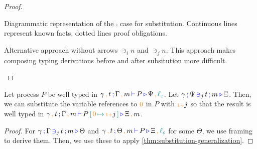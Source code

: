 \begin{proof}[Proof]
\begin{itemize}
\begin{minipage}[b]{0.5\linewidth}
        Diagrammatic representation of the $\comp{}{}$ case for substitution.
        Continuous lines represent known facts, dotted lines proof obligations.
      \end{minipage}
      \begin{minipage}[b]{0.5\linewidth}
        \centering

        Alternative approach without arrows $\ni_i n$ and $\ni_j n$.
        This approach makes composing typing derivations before and after subsitution more difficult.
      \end{minipage}

  \end{itemize}  
\end{proof}

\begin{nitheorem}[Substitution]
  \label{thm:substitution}
  Let process $P$ be well typed in $\types{\gamma \comma t}{\Gamma \comma m}{P}{\Psi \comma \lz}$.
  Let $\contains{\gamma}{\Psi}{j}{t}{m}{\Xi}$.
  Then, we can substitute the variable references to $\constr{0}$ in $P$ with $\suc j$ so that the result is well typed in $\types{\gamma \comma t}{\Gamma \comma m}{\subst{P}{\suc j}{\constr{0}}}{\Xi \comma m}$.
\end{nitheorem}
\begin{proof}[Proof]
  For $\contains{\gamma}{\Gamma}{j}{t}{m}{\Theta}$ and $\types{\gamma \comma t}{\Theta \comma m}{P}{\Xi \comma \lz}$ for some $\Theta$, we use framing to derive them.
  Then, we use these to apply \autoref{thm:substitution-generalization}.
\end{proof}


